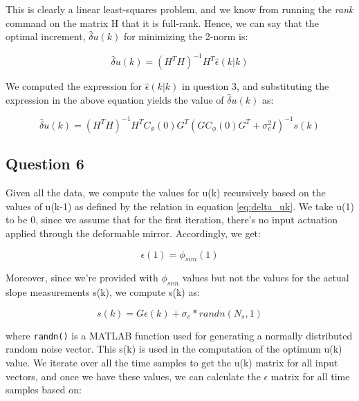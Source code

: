 \documentclass[12pt]{report}
\begin{document}
This is clearly a linear least-squares problem, and we know from running the \textit{rank} command on the matrix H that it is full-rank. Hence, we can say that the optimal increment, $\hat\delta u(k)$ for minimizing the 2-norm is:

\begin{equation*}
\hat\delta u(k) = (H^{T}H)^{-1}H^{T}\hat\epsilon(k|k)
\end{equation*}

We computed the expression for $\hat\epsilon(k|k)$ in question 3, and substituting the expression in the above equation yields the value of $\hat\delta u(k)$ as:

\begin{equation}\label{eq:delta_uk}
\hat\delta u(k) = (H^{T}H)^{-1}H^{T}C_{\phi}(0)G^{T}(GC_{\phi}(0)G^{T} + \sigma_{e}^{2}I)^{-1}s(k)
\end{equation}

\subsection*{Question 6}

Given all the data, we compute the values for u(k) recursively based on the values of u(k-1) as defined by the relation in equation \ref{eq:delta_uk}. We take u(1) to be 0, since we assume that for the first iteration, there's no input actuation applied through the deformable mirror. Accordingly, we get:

\begin{equation*}
\epsilon(1) = \phi_{sim}(1)
\end{equation*}

Moreover, since we're provided with $\phi_{sim}$ values but not the values for the actual slope measurements s(k), we compute s(k) as: 

\begin{equation*}
s(k) = G\epsilon(k) + \sigma_{e}*randn(N_{s},1) 
\end{equation*}

where \texttt{randn()} is a MATLAB function used for generating a normally distributed random noise vector.
This s(k) is used in the computation of the optimum u(k) value.
We iterate over all the time samples to get the u(k) matrix for all input vectors, and once we have these values, we can calculate the $\epsilon$ matrix for all time samples based on: 
\end{document}
